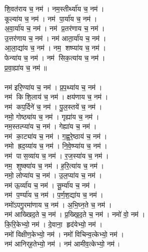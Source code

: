 शि॒वत॑राय च॒ नम॑। नम॒स्तीर्थ्या॑य च॒ नम॑। \\
कूल्या॑य च॒ नम॑। नम॑ पा॒र्या॑य च॒ नम॑। \\
अ॒वा॒र्या॑य च॒ नम॑। नम॑ प्र॒तर॑णाय च॒ नम॑। \\
उ॒त्तर॑णाय च॒ नम॑। नम॑ आता॒र्या॑य च॒ नम॑। \\
आ॒ला॒द्या॑य च॒ नम॑। नम॒ शष्प्या॑य च॒ नम॑। \\
फेन्या॑य च॒ नम॑। नम॑ सिक॒त्या॑य च॒ नम॑। \\
प्र॒वा॒ह्या॑य च॒ नम॑॥ \\
\\
नम॑ इरि॒ण्या॑य च॒ नम॑। प्र॒प॒थ्या॑य च॒ नम॑। \\
नम॑ किशि॒लाय॑ च॒ नम॑। क्षय॑णाय च॒ नम॑। \\
नम॑ कप॒र्दिने॑ च॒ नम॑। पु॒ल॒स्तये॑ च॒ नम॑।\\
नमो॒ गोष्ठ्या॑य च॒ नम॑। गृह्या॑य च॒ नम॑। \\
नम॒स्तल्प्या॑य च॒ नम॑। गेह्या॑य च॒ नम॑। \\
नम॑ का॒ट्या॑य च॒ नम॑। ग॒ह्व॒रे॒ष्ठाय॑ च॒ नम॑।\\
नमो ह्रद॒य्या॑य च॒ नम॑। नि॒वे॒ष्प्या॑य च॒ नम॑। \\
नम॑ पास॒व्या॑य च॒ नम॑। र॒ज॒स्या॑य च॒ नम॑।\\
नम॒ शुष्क्या॑य च॒ नम॑। ह॒रि॒त्या॑य च॒ नम॑। \\
नमो॒ लोप्या॑य च॒ नम॑। उ॒ल॒प्या॑य च॒ नम॑। \\
नम॑ ऊ॒र्व्या॑य च॒ नम॑। सू॒र्म्या॑य च॒ नम॑। \\
नम॑ प॒र्ण्या॑य च॒ नम॑। प॒र्ण॒श॒द्या॑य च॒ नम॑। \\
नमो॑ऽपगु॒रमा॑णाय च॒ नम॑। अ॒भि॒घ्न॒ते च॒ नम॑। \\
नम॑ आख्खिद॒ते च॒ नम॑। प्र॒ख्खि॒द॒ते च॒ नम॑। नमो॑ वो॒ नम॑। \\
कि॒रि॒केभ्यो॒ नम॑। दे॒वाना॒ हृद॑येभ्यो॒ नम॑। \\
नमो॑ विक्षीण॒केभ्यो॒ नम॑। नमो॑ विचिन्व॒त्केभ्यो॒ नम॑। \\
नम॑ आनिर्‌ह॒तेभ्यो॒ नम॑। नम॑ आमीव॒त्केभ्यो॒ नम॑। \\
{\small \closesection}


